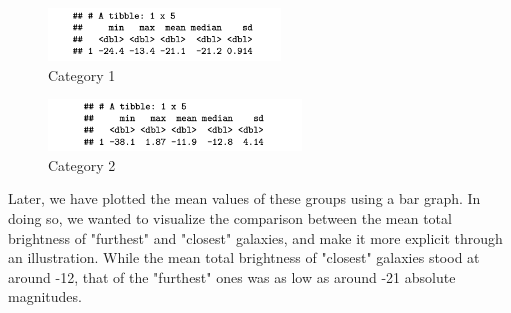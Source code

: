 \documentclass[12pt]{article}
\begin{document}
\newpage

\begin{figure}[h]
	\centering
	\includegraphics[width=0.55\textwidth]{pic/r2t2.png}
	\caption{Category 1}
\end{figure}

\begin{figure}[h]
	\centering
	\includegraphics[width=0.6\textwidth]{pic/r2t3.png}
	\caption{Category 2}
\end{figure}
\noindent
Later, we have plotted the mean values of these groups using a bar graph. In doing so, we wanted to visualize the comparison between the mean total brightness of "furthest" and "closest" galaxies, and make it more explicit through an illustration. While the mean total brightness of "closest" galaxies stood at around -12, that of the "furthest" ones was as low as around -21 absolute magnitudes. 
\end{document}
